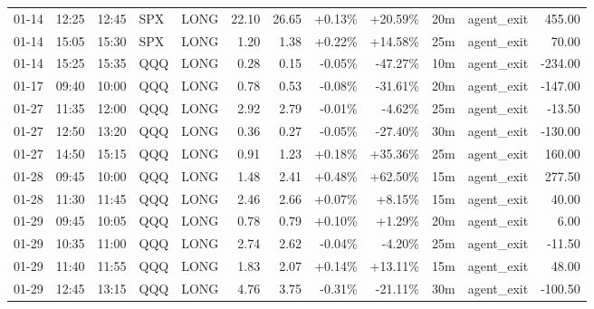 \documentclass[11pt,a4paper]{article}
\begin{document}
\begin{center}
\begin{longtable}{>{\color{txtmain}}l l l l l r r r r r >{\color{txtmain}}l r}
01-14 & 12:25 & 12:45 & SPX & LONG & 22.10 & 26.65 & \textcolor{wingreen}{+0.13\%} & \textcolor{wingreen}{+20.59\%} & 20m & agent\_exit & \textcolor{wingreen}{455.00} \\
01-14 & 15:05 & 15:30 & SPX & LONG & 1.20 & 1.38 & \textcolor{wingreen}{+0.22\%} & \textcolor{wingreen}{+14.58\%} & 25m & agent\_exit & \textcolor{wingreen}{70.00} \\
01-14 & 15:25 & 15:35 & QQQ & LONG & 0.28 & 0.15 & \textcolor{lossred}{-0.05\%} & \textcolor{lossred}{-47.27\%} & 10m & agent\_exit & \textcolor{lossred}{-234.00} \\
01-17 & 09:40 & 10:00 & QQQ & LONG & 0.78 & 0.53 & \textcolor{lossred}{-0.08\%} & \textcolor{lossred}{-31.61\%} & 20m & agent\_exit & \textcolor{lossred}{-147.00} \\
01-27 & 11:35 & 12:00 & QQQ & LONG & 2.92 & 2.79 & \textcolor{lossred}{-0.01\%} & \textcolor{lossred}{-4.62\%} & 25m & agent\_exit & \textcolor{lossred}{-13.50} \\
01-27 & 12:50 & 13:20 & QQQ & LONG & 0.36 & 0.27 & \textcolor{lossred}{-0.05\%} & \textcolor{lossred}{-27.40\%} & 30m & agent\_exit & \textcolor{lossred}{-130.00} \\
01-27 & 14:50 & 15:15 & QQQ & LONG & 0.91 & 1.23 & \textcolor{wingreen}{+0.18\%} & \textcolor{wingreen}{+35.36\%} & 25m & agent\_exit & \textcolor{wingreen}{160.00} \\
01-28 & 09:45 & 10:00 & QQQ & LONG & 1.48 & 2.41 & \textcolor{wingreen}{+0.48\%} & \textcolor{wingreen}{+62.50\%} & 15m & agent\_exit & \textcolor{wingreen}{277.50} \\
01-28 & 11:30 & 11:45 & QQQ & LONG & 2.46 & 2.66 & \textcolor{wingreen}{+0.07\%} & \textcolor{wingreen}{+8.15\%} & 15m & agent\_exit & \textcolor{wingreen}{40.00} \\
01-29 & 09:45 & 10:05 & QQQ & LONG & 0.78 & 0.79 & \textcolor{wingreen}{+0.10\%} & \textcolor{wingreen}{+1.29\%} & 20m & agent\_exit & \textcolor{wingreen}{6.00} \\
01-29 & 10:35 & 11:00 & QQQ & LONG & 2.74 & 2.62 & \textcolor{lossred}{-0.04\%} & \textcolor{lossred}{-4.20\%} & 25m & agent\_exit & \textcolor{lossred}{-11.50} \\
01-29 & 11:40 & 11:55 & QQQ & LONG & 1.83 & 2.07 & \textcolor{wingreen}{+0.14\%} & \textcolor{wingreen}{+13.11\%} & 15m & agent\_exit & \textcolor{wingreen}{48.00} \\
01-29 & 12:45 & 13:15 & QQQ & LONG & 4.76 & 3.75 & \textcolor{lossred}{-0.31\%} & \textcolor{lossred}{-21.11\%} & 30m & agent\_exit & \textcolor{lossred}{-100.50} \\

\end{longtable}
\end{center}
\end{document}
